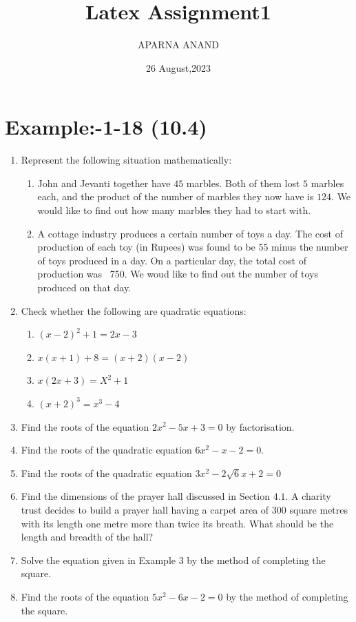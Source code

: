 \documentclass{article}
\theoremstyle{remark}
\begin{document}
\title{Latex Assignment1}
\author{APARNA ANAND}
\date{26 August,2023}
\maketitle
\section*{Example:-1-18 (10.4)}
\begin{enumerate}
\item Represent the following situation mathematically:
\begin{enumerate}[label=(\roman*)]
\item John and Jevanti together have $45$ marbles. Both of them lost $5$ marbles each, and the product of the number of marbles they now have is $124$. We would like to find out how many marbles they had to start with.
\item A cottage industry produces a certain number of toys a day. The cost of production of each toy (in Rupees) was found to be $55$ minus the number of toys produced in a day. On a particular day, the total cost of production was \rupee~750. We woud like to find out the number of toys produced on that day.
\end{enumerate}
\item Check whether the following are quadratic equations:
\begin{enumerate}[label=(\roman*)]
\item $(x-2)^2+1=2x-3$
\item $x(x+1)+8 = (x+2) (x-2)$
\item $x(2x+3) = X^2+1$
\item $(x+2)^3 = x^3-4$
\end{enumerate}
\item Find the roots of the equation $2x^2 -5x+3 = 0$  by factorisation.
\item Find the roots of the quadratic equation $6x^2 -x-2 = 0$.
\item Find the roots of the quadratic equation $3x^2 -2\sqrt6x+2 = 0$
\item Find the dimensions of the prayer hall discussed in Section $4.1$. A charity trust decides to build a prayer hall having a carpet area of 300 square metres with its length one metre more than twice its breath. What should be the length and breadth of the hall?
\item Solve the equation given in Example $3$ by the method of completing the square.
\item Find the roots of the equation $5x^2-6x-2 = 0$ by the method of completing the square.

\end{enumerate}
\end{document}
